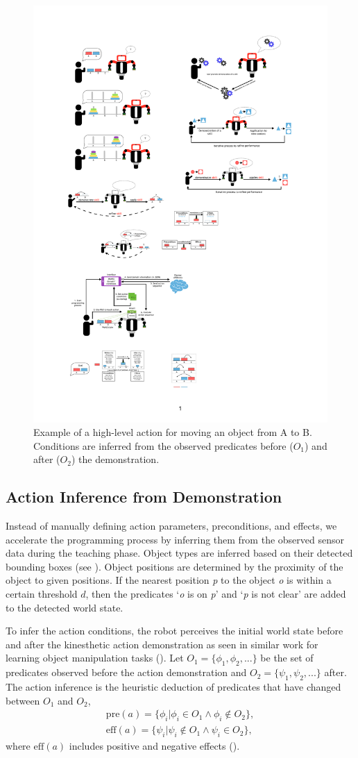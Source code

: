 \begin{figure}
\centering
\includegraphics[width=0.5\linewidth]{figures/high-level.pdf}
\caption{Example of a high-level action for moving an object from A to B. Conditions are inferred from the observed predicates before ($O_1$) and after ($O_2$) the demonstration.
}
\label{fig:action-model}
\end{figure}

\subsection{Action Inference from Demonstration}
\label{sec:inference}
Instead of manually defining action parameters, preconditions, and effects, we accelerate the programming process by inferring them from the observed sensor data during the teaching phase.
Object types are inferred based on their detected bounding boxes (see ).
Object positions are determined by the proximity of the object to given positions.
If the nearest position \emph{p} to the object \emph{o} is within a certain threshold $d$, then the predicates `\emph{o} is on \emph{p}' and `\emph{p} is not clear' are added to the detected world state.

To infer the action conditions, the robot perceives the initial world state   before %
and after the kinesthetic action demonstration as seen in similar work for learning object manipulation tasks (\cite{ahmadzadeh2015learning}).
Let $O_1 = \{\phi_1, \phi_2, ... \}$ be the set of predicates observed before the action demonstration and $O_2 = \{\psi_1, \psi_2, ... \}$ after.
The action inference is the heuristic deduction of predicates that have changed between $O_1$ and $O_2$, \ie
\begin{align*} \text{pre}(a) = \{\phi_i | \phi_i \in O_1 \wedge \phi_i \notin O_2 \}, \\
\text{eff}(a) = \{\psi_i | \psi_i \notin O_1 \wedge \psi_i \in O_2 \}, 
\end{align*}
where $\text{eff}(a)$ includes positive and negative effects ().


